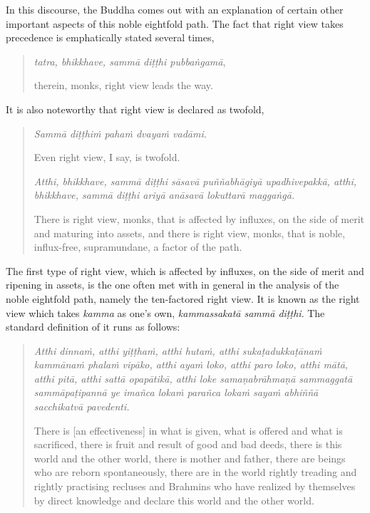 In this discourse, the Buddha comes out with an explanation of certain other important aspects of this noble eightfold path. The fact that right view takes precedence is emphatically stated several times,

\begin{quote}
\emph{tatra, bhikkhave, sammā diṭṭhi pubbaṅgamā},

therein, monks, right view leads the way.
\end{quote}

It is also noteworthy that right view is declared as twofold,

\begin{quote}
\emph{Sammā diṭṭhiṁ pahaṁ dvayaṁ vadāmi.}

Even right view, I say, is twofold.

\emph{Atthi, bhikkhave, sammā diṭṭhi sāsavā puññabhāgiyā upadhivepakkā, atthi, bhikkhave, sammā diṭṭhi ariyā anāsavā lokuttarā maggaṅgā.}

There is right view, monks, that is affected by influxes, on the side of merit and maturing into assets, and there is right view, monks, that is noble, influx-free, supramundane, a factor of the path.
\end{quote}

The first type of right view, which is affected by influxes, on the side of merit and ripening in assets, is the one often met with in general in the analysis of the noble eightfold path, namely the ten-factored right view. It is known as the right view which takes \emph{kamma} as one's own, \emph{kammassakatā sammā diṭṭhi}. The standard definition of it runs as follows:

\begin{quote}
\emph{Atthi dinnaṁ, atthi yiṭṭhaṁ, atthi hutaṁ, atthi sukaṭadukkaṭānaṁ kammānaṁ phalaṁ vipāko, atthi ayaṁ loko, atthi paro loko, atthi mātā, atthi pitā, atthi sattā opapātikā, atthi loke samaṇabrāhmaṇā sammaggatā sammāpaṭipannā ye imañca lokaṁ parañca lokaṁ sayaṁ abhiññā sacchikatvā pavedenti.}

There is {[}an effectiveness{]} in what is given, what is offered and what is sacrificed, there is fruit and result of good and bad deeds, there is this world and the other world, there is mother and father, there are beings who are reborn spontaneously, there are in the world rightly treading and rightly practising recluses and Brahmins who have realized by themselves by direct knowledge and declare this world and the other world.
\end{quote}

